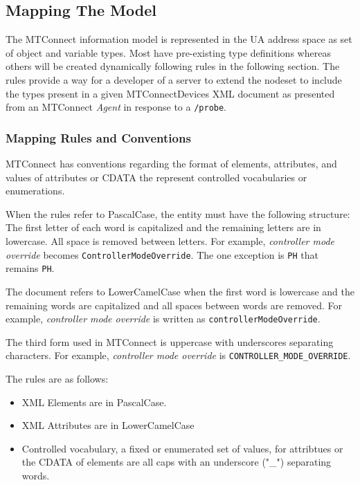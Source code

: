 \subsection{Mapping The Model}
\lstset{language=XML,numbers=left,xleftmargin=2em}

The MTConnect information model is represented in the UA address space as set of object and variable types. Most have pre-existing type definitions whereas others will be created dynamically following rules in the following section. The rules provide a way for a developer of a server to extend the nodeset to include the types present in a given MTConnectDevices XML document as presented from an MTConnect \textit{Agent} in response to a \texttt{/probe}.

\subsubsection{Mapping Rules and Conventions}\label{sec:mapping-rules}

MTConnect has conventions regarding the format of elements, attributes, and values of attributes or CDATA the represent controlled vocabularies or enumerations. 

When the rules refer to \gls{PascalCase}, the entity must have the following structure: The first letter of each word is capitalized and the remaining letters are in lowercase. All space is removed between letters. For example, \textit{controller mode override} becomes \texttt{Controller\-Mode\-Override}. The one exception is \texttt{PH} that remains \texttt{PH}.

The document refers to \gls{LowerCamelCase} when the first word is lowercase and the remaining words are capitalized and all spaces between words are removed. For example, \textit{controller mode override} is written as \texttt{controllerModeOverride}.

The third form used in MTConnect is uppercase with underscores separating characters. For example, \textit{controller mode override} is \texttt{CONTROLLER_MODE_OVERRIDE}.

The rules are as follows:
\begin{itemize}
  \item XML Elements are in \gls{PascalCase}.
  \item XML Attributes are in \gls{LowerCamelCase}
  \item Controlled vocabulary, a fixed or enumerated set of values, for attribtues or the CDATA of elements are all caps with an underscore ("\_") separating words. 
\end{itemize}

